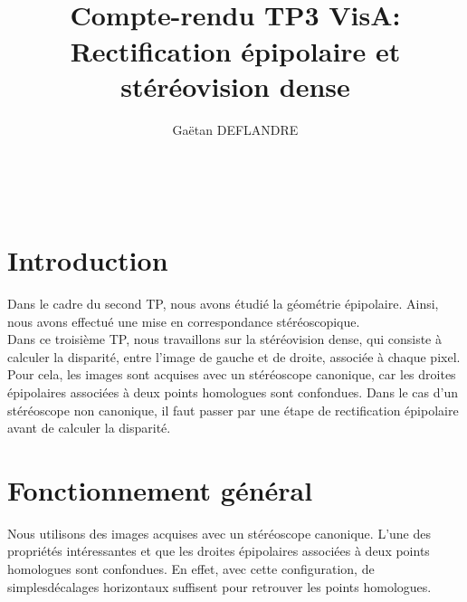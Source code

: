\documentclass[a4paper,11pt]{article}
\title{
  \noindent\hrulefill \\
  \vspace{10mm} Compte-rendu TP3 VisA: Rectification épipolaire et stéréovision dense
}
\author{Gaëtan DEFLANDRE}
\begin{document}
\maketitle

\noindent\hrulefill \\


\section{Introduction}
Dans le cadre du second TP, nous avons étudié la géométrie épipolaire. Ainsi, nous avons
effectué une mise en correspondance stéréoscopique. \\

Dans ce troisième TP, nous travaillons sur la stéréovision dense, qui consiste à calculer 
la disparité, entre l'image de gauche et de droite, associée à chaque pixel. Pour cela, les 
images sont acquises avec un stéréoscope canonique, car les droites épipolaires associées à 
deux points homologues sont confondues. Dans le cas d'un stéréoscope non canonique, il faut 
passer par une étape de rectification épipolaire avant de calculer la disparité.\\

\newpage

\section{Fonctionnement général}

Nous utilisons des images acquises avec un stéréoscope canonique. L'une des propriétés 
intéressantes et que les droites épipolaires associées à deux points homologues sont 
confondues. En effet, avec cette configuration, de simplesdécalages horizontaux suffisent 
pour retrouver les points homologues.\\

\begin{figure}[H]
  \centering
\end{figure}
\end{document}
